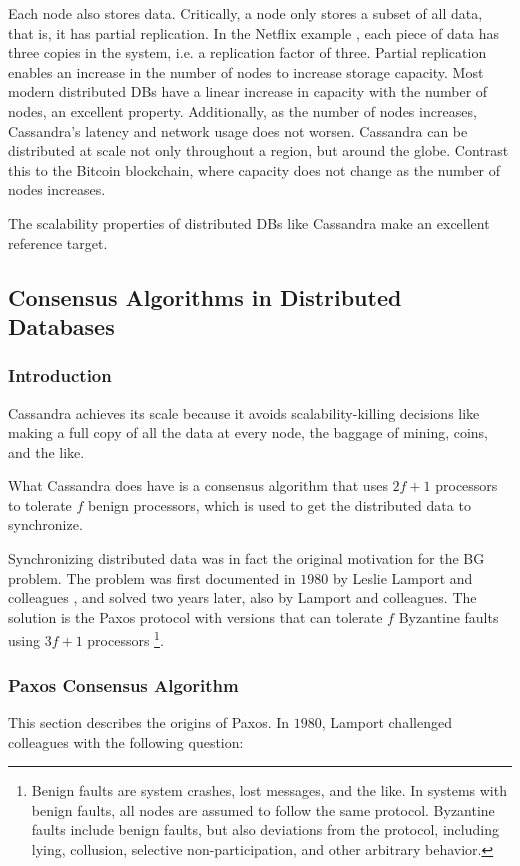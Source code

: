 Each node also stores data.
Critically, a node only stores a subset of all data, that is, it has partial replication.
In the Netflix example \cite{kalantzis_netflix}, each piece of data has three copies in the system, i.e. a replication factor of three.
Partial replication enables an increase in the number of nodes to increase storage capacity.
Most modern distributed DBs have a linear increase in capacity with the number of nodes, an excellent property.
Additionally, as the number of nodes increases, Cassandra’s latency and network usage does not worsen.
Cassandra can be distributed at scale not only throughout a region, but around the globe.
Contrast this to the Bitcoin blockchain, where capacity does not change as the number of nodes increases.

The scalability properties of distributed DBs like Cassandra make an excellent reference target.

\subsection{Consensus Algorithms in Distributed Databases}
\subsubsection{Introduction}
Cassandra achieves its scale because it avoids scalability-killing decisions like making a full copy of all the data at every node, the baggage of mining, coins, and the like.

What Cassandra does have is a consensus algorithm that uses $2f+1$ processors to tolerate $f$ benign processors\cite{lamport1998part}, which is used to get the distributed data to synchronize.

Synchronizing distributed data was in fact the original motivation for the BG problem.
The problem was first documented in $1980$ by Leslie Lamport and colleagues \cite{pease1980reaching}, and solved two years later, also by Lamport and colleagues.
The solution is the Paxos protocol \cite{lamport1982byzantine} with versions that can tolerate $f$ Byzantine faults using $3f+1$ processors \cite{lamport2011byzantizing, castro2001byzantine}\footnote{Benign faults are system crashes, lost messages, and the like. In systems with benign faults, all nodes are assumed to follow the same protocol.
Byzantine faults include benign faults, but also deviations from the protocol, including lying, collusion, selective non-participation, and other arbitrary behavior.}.

\subsubsection{Paxos Consensus Algorithm}\label{subsec:distributed:paxos}
This section describes the origins of Paxos.
In $1980$, Lamport challenged colleagues with the following question:  \cite{lamport_writings}

